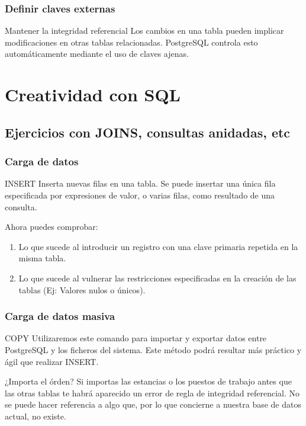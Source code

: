 \documentclass{classes/beamer_GeomaticaUA}
\begin{document}
\begin{frame}[fragile]
\frametitle{Definir claves externas}

\begin{block}{Mantener la integridad referencial}
Los cambios en una tabla pueden implicar modificaciones en otras tablas relacionadas. PostgreSQL controla esto automáticamente mediante el uso de claves ajenas.
\end{block}



\end{frame}


\section[Ejercicios]{Creatividad con SQL}
\subsection{Ejercicios con JOINS, consultas anidadas, etc}
\begin{frame}[fragile]
\frametitle{Carga de datos}
\begin{block}{INSERT}
Inserta nuevas filas en una tabla. Se puede insertar una única fila especificada por expresiones de valor, o varias filas, como resultado de una consulta.
\end{block}



Ahora puedes comprobar:
\begin{enumerate}
\item Lo que sucede al introducir un registro con una clave primaria repetida en la misma tabla.
\item Lo que sucede al vulnerar las restricciones especificadas en la creación de las tablas (Ej: Valores nulos o únicos).
\end{enumerate}

\end{frame}


\begin{frame}[fragile]
\frametitle{Carga de datos masiva}

\begin{block}{COPY}
Utilizaremos este comando para importar y exportar datos entre PostgreSQL y los ficheros del sistema. Este método podrá resultar más práctico y ágil que realizar INSERT.
\end{block}



\begin{alertblock}{¿Importa el órden?}
Si importas las estancias o los puestos de trabajo antes que las otras tablas te habrá aparecido un error de regla de integridad referencial. No se puede hacer referencia a algo que, por lo que concierne a nuestra base de datos actual, no existe.
\end{alertblock}

\end{frame}
\end{document}
